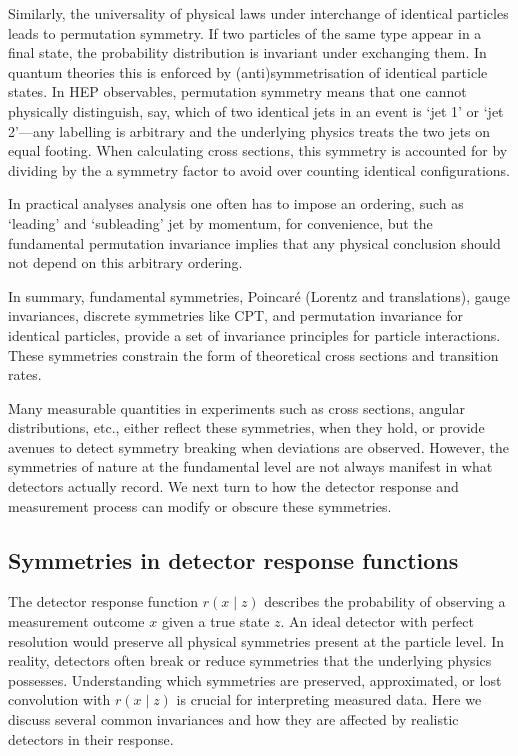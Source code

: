         Similarly, the universality of physical laws under interchange of identical particles leads to permutation symmetry.
        If two particles of the same type appear in a final state, the probability distribution is invariant under exchanging them.
        In quantum theories this is enforced by (anti)symmetrisation of identical particle states.
            In HEP observables, permutation symmetry means that one cannot physically distinguish, say, which of two identical jets in an event is `jet 1' or `jet 2'---any labelling is arbitrary and the underlying physics treats the two jets on equal footing.
            When calculating cross sections, this symmetry is accounted for by dividing by the a symmetry factor to avoid over counting identical configurations.
            
            In practical analyses analysis one often has to impose an ordering, such as `leading' and `subleading' jet by momentum, for convenience, but the fundamental permutation invariance implies that any physical conclusion should not depend on this arbitrary ordering.

            In summary, fundamental symmetries, Poincar\'e (Lorentz and translations), gauge invariances, discrete symmetries like CPT, and permutation invariance for identical particles, provide a set of invariance principles for particle interactions.
            These symmetries constrain the form of theoretical cross sections and transition rates.
            
            Many measurable quantities in experiments such as cross sections, angular distributions, etc., either reflect these symmetries, when they hold, or provide avenues to detect symmetry breaking when deviations are observed.
            However, the symmetries of nature at the fundamental level are not always manifest in what detectors actually record.
            We next turn to how the detector response and measurement process can modify or obscure these symmetries.

    \subsection{Symmetries in detector response functions}
    \label{subsec:detector-symmetries}
        The detector response function $r(x\mid z)$ describes the probability of observing a measurement outcome $x$ given a true state $z$.
        An ideal detector with perfect resolution would preserve all physical symmetries present at the particle level.
        In reality, detectors often break or reduce symmetries that the underlying physics possesses.
        Understanding which symmetries are preserved, approximated, or lost convolution with $r(x\mid z)$ is crucial for interpreting measured data.
        Here we discuss several common invariances and how they are affected by realistic detectors in their response.

